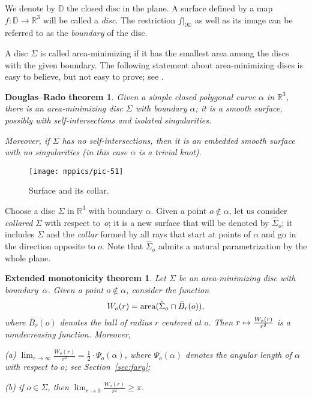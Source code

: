 \documentclass{article}
\newcommand*{\z}[1]{#1\nobreak\discretionary{}%
            {\hbox{$\mathsurround=0pt #1$}}{}}
\theoremstyle{theorem}
\newtheorem{Crofton-type formula}[theorem]{Crofton-type formula}
\newtheorem{Douglas--Rado theorem}[theorem]{Douglas--Rado theorem}
\newtheorem{Extended monotonicity theorem}[theorem]{Extended monotonicity theorem}
\theoremstyle{definition}
\def\area{\mathop{\rm area}\nolimits}
\begin{document}
We denote by $\mathbb{D}$ the closed disc in the plane.
A surface defined by a map $f\colon\mathbb{D}\to\mathbb{R}^3$ will be called a \emph{disc}.
The restriction $f|_{\partial \mathbb{D}}$ as well as its image can be referred to as the \emph{boundary} of the disc.

A disc $\Sigma$ is called area-minimizing if it has the smallest area among the discs with the given boundary.
The following statement about area-minimizing discs is easy to believe, but not easy to prove; see \cite{white-lectures}.

\begin{Douglas--Rado theorem}\label{thm:min-exists}
Given a simple closed polygonal curve $\alpha$ in $\mathbb{R}^3$, there is an area-minimizing disc $\Sigma$ with boundary $\alpha$; it is a smooth surface, possibly with self-intersections and isolated singularities.

Moreover, if $\Sigma$ has no self-intersections, then it is an embedded smooth surface with no singularities (in this case $\alpha$ is a trivial knot).
\end{Douglas--Rado theorem}

\begin{figure}[!ht]
\vskip-0mm
\centering
\texttt{[image: mppics/pic-51]}
\caption{Surface and its collar.}
\vskip0mm
\end{figure}

Choose a disc $\Sigma$ in $\mathbb{R}^3$ with boundary $\alpha$.
Given a point $o\notin \alpha$, let us consider \emph{collared} $\Sigma$ with respect to~$o$;
it is a new surface that will be denoted by $\hat\Sigma_o$;
it includes $\Sigma$ and the \emph{collar} formed by all rays that start at points of $\alpha$ and go in the direction opposite to $o$.
Note that $\hat\Sigma_o$ admits a natural parametrization by the whole plane.

\begin{Extended monotonicity theorem}\label{thm:monotonicity}
Let $\Sigma$ be an area-minimizing disc with boundary~$\alpha$.
Given a point $o\notin \alpha$, consider the function 
\[W_o(r)=\area (\hat\Sigma_o\cap \bar B_r(o)),\]
where $\bar B_r(o)$ denotes the ball of radius $r$ centered at $o$.
Then $r\z\mapsto \frac{W_o(r)}{r^2}$ is a nondecreasing function.
Moreover, 

\noindent(a)
$\lim_{r\to\infty}\frac{W_o(r)}{r^2}=\tfrac12\cdot \Psi_o(\alpha)$, where $\Psi_o(\alpha)$ denotes the angular length of $\alpha$ with respect to $o$; see Section~\ref{sec:fary};

\noindent(b) if $o\in \Sigma$, then $\lim_{r\to0}\frac{W_o(r)}{r^2}\ge \pi$.

\end{Extended monotonicity theorem}
\end{document}
